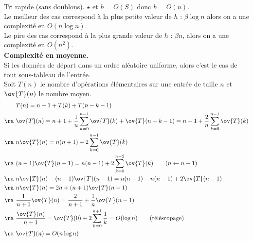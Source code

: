 \documentclass[french, 11pt]{article}
\begin{document}
\begin{defi}{Tri rapide (sans doublons). $\star$}{}
    et $h=O(S)$ donc $h=O(n)$.\\
    Le meilleur des cas correspond à la plus petite valeur de $h$ : $\beta\log n$ alors on a une complexité en $O(n\log n)$.\\
    Le pire des cas correspond à la plus grande valeur de $h$ : $\beta n$, alors on a une complexité en $O(n^2)$.\\
    \textbf{Complexité en moyenne.}\\
    Si les données de départ dans un ordre aléatoire uniforme, alors c'est le cas de tout sous-tableau de l'entrée.\\
    Soit $T(n)$ le nombre d'opérations élémentaires sur une entrée de taille $n$ et $\ov{T}(n)$ le nombre moyen.
    \begin{align*}
        &T(n) = n + 1 + T(k) + T(n - k - 1)\\
        \ra~&\ov{T}(n) = n+1+\frac{1}{n}\sum_{k=0}^{n-1}{\ov{T}(k)+\ov{T}(n-k-1)}=n+1+\frac{2}{n}\sum_{k=0}^{n-1}\ov{T}(k)\\
        \ra~&n\ov{T}(n) = n(n+1) + 2\sum_{k=0}^{n-1}\ov{T}(k)\\
        \ra~&(n-1)\ov{T}(n-1)=n(n-1) + 2\sum_{k=0}^{n-2}\ov{T}(k) \qquad (n \gets n-1)\\
        \ra~&n\ov{T}(n) - (n-1)\ov{T}(n-1) = n(n+1) - n(n-1)+2\ov{T}(n-1)\\
        \ra~&n\ov{T}(n) = 2n +(n+1)\ov{T}(n-1)\\
        \ra~&\frac{1}{n+1}\ov{T}(n)=\frac{2}{n+1}+\frac{1}{n}\ov{T}(n-1)\\
        \ra~&\frac{\ov{T}(n)}{n+1}=\ov{T}(0) + 2\sum_{k=0}^{n+1}\frac{1}{k} = O(\log n) \qquad \text{(téléscopage)}\\
        \ra~&\ov{T}(n)=O(n\log n)
    \end{align*}
\end{defi}
\end{document}

